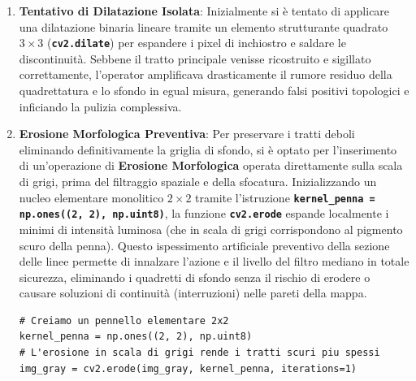 \documentclass[12pt,a4paper]{article}
\begin{document}
    \begin{enumerate}
    \item \textbf{Tentativo di Dilatazione Isolata}: Inizialmente si è tentato di applicare una dilatazione binaria lineare tramite un elemento strutturante quadrato $3 \times 3$ (\textbf{\texttt{cv2.dilate}}) per espandere i pixel di inchiostro e saldare le discontinuità. Sebbene il tratto principale venisse ricostruito e sigillato correttamente, l'operator amplificava drasticamente il rumore residuo della quadrettatura e lo sfondo in egual misura, generando falsi positivi topologici e inficiando la pulizia complessiva.
    \item \textbf{Erosione Morfologica Preventiva}: Per preservare i tratti deboli eliminando definitivamente la griglia di sfondo, si è optato per l'inserimento di un'operazione di \textbf{Erosione Morfologica} operata direttamente sulla scala di grigi, prima del filtraggio spaziale e della sfocatura. Inizializzando un nucleo elementare monolitico $2 \times 2$ tramite l'istruzione \textbf{\texttt{kernel\_penna = np.ones((2, 2), np.uint8)}}, la funzione \textbf{\texttt{cv2.erode}} espande localmente i minimi di intensità luminosa (che in scala di grigi corrispondono al pigmento scuro della penna). Questo ispessimento artificiale preventivo della sezione delle linee permette di innalzare l'azione e il livello del filtro mediano in totale sicurezza, eliminando i quadretti di sfondo senza il rischio di erodere o causare soluzioni di continuità (interruzioni) nelle pareti della mappa.
        \begin{lstlisting}[style=vscode-esatto, caption={Pennello ed erosione morfologica}]
# Creiamo un pennello elementare 2x2
kernel_penna = np.ones((2, 2), np.uint8)
# L'erosione in scala di grigi rende i tratti scuri piu spessi
img_gray = cv2.erode(img_gray, kernel_penna, iterations=1)
	   \end{lstlisting}


\end{enumerate}
\end{document}
